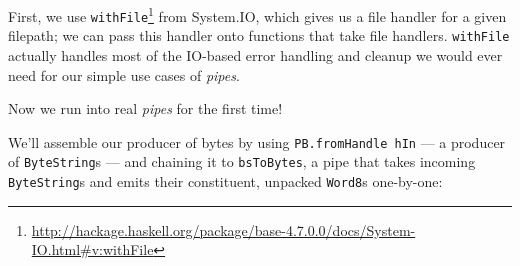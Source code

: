 \documentclass[]{article}
\newenvironment{Shaded}{}{}
\newcommand{\CommentTok}[1]{\textcolor[rgb]{0.38,0.63,0.69}{\textit{#1}}}
\newcommand{\DataTypeTok}[1]{\textcolor[rgb]{0.56,0.13,0.00}{#1}}
\newcommand{\DecValTok}[1]{\textcolor[rgb]{0.25,0.63,0.44}{#1}}
\newcommand{\FunctionTok}[1]{\textcolor[rgb]{0.02,0.16,0.49}{#1}}
\newcommand{\KeywordTok}[1]{\textcolor[rgb]{0.00,0.44,0.13}{\textbf{#1}}}
\newcommand{\NormalTok}[1]{#1}
\newcommand{\OtherTok}[1]{\textcolor[rgb]{0.00,0.44,0.13}{#1}}
\renewcommand{\href}[2]{#2\footnote{\url{#1}}}
\begin{document}
\begin{Shaded}
\end{Shaded}

First, we use
\href{http://hackage.haskell.org/package/base-4.7.0.0/docs/System-IO.html\#v:withFile}{\texttt{withFile}}
from System.IO, which gives us a file handler for a given filepath; we can pass
this handler onto functions that take file handlers. \texttt{withFile} actually
handles most of the IO-based error handling and cleanup we would ever need for
our simple use cases of \emph{pipes}.

Now we run into real \emph{pipes} for the first time!

We'll assemble our producer of bytes by using \texttt{PB.fromHandle\ hIn} --- a
producer of \texttt{ByteString}s --- and chaining it to \texttt{bsToBytes}, a
pipe that takes incoming \texttt{ByteString}s and emits their constituent,
unpacked \texttt{Word8}s one-by-one:
\end{document}
